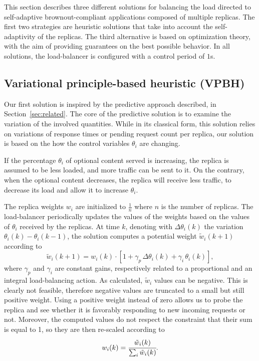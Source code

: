 This section describes three different solutions for balancing the
load directed to self-adaptive brownout-compliant applications
composed of multiple replicas. The first two strategies are heuristic
solutions that take into account the self-adaptivity of the
replicas. The third alternative is based on optimization theory, with
the aim of providing guarantees on the best possible behavior. In all
solutions, the load-balancer is configured with a control period of
$1$s.

\subsection{Variational principle-based heuristic (VPBH)}

Our first solution is inspired by the predictive approach described,
in Section~\ref{sec:related}. The core of the predictive solution is
to examine the variation of the involved quantities. While in its
classical form, this solution relies on variations of response times
or pending request count per replica, our solution is based on the how
the control variables $\theta_i$ are changing.

If the percentage $\theta_i$ of optional content served is increasing,
the replica is assumed to be less loaded, and more traffic can be sent
to it. On the contrary, when the optional content decreases, the
replica will receive less traffic, to decrease its load and allow it
to increase $\theta_i$.

The replica weights $w_i$ are initialized to $\frac{1}{n}$ where $n$
is the number of replicas. The load-balancer periodically updates the
values of the weights based on the values of $\theta_i$ received by
the replicas. At time $k$, denoting with $\Delta \theta_i (k)$ the
variation $\theta_i (k) - \theta_i (k-1)$, the solution computes a
potential weight $\tilde{w}_i(k+1)$ according to
\begin{equation}
  \tilde{w}_i(k+1) = w_i(k) \cdot 
\left[ 1 + \gamma_p \, \Delta \theta_i (k) + \gamma_i \, \theta_i (k) \right] ,
\label{eq:theta-diff}
\end{equation}
where $\gamma_p$ and $\gamma_i$ are constant gains, respectively
related to a proportional and an integral load-balancing action. As
calculated, $\tilde{w}_i$ values can be negative. This is clearly not
feasible, therefore negative values are truncated to a small but still
positive weight. Using a positive weight instead of zero allows us to
probe the replica and see whether it is favorably responding to new
incoming requests or not. Moreover, the computed values do not respect
the constraint that their sum is equal to 1, so they are then
re-scaled according to
\begin{equation}
  w_i (k) = \cfrac{\tilde{w}_i (k)}{\sum_i \tilde{w}_i (k)}.
\label{eq:theta-diff-rescale}
\end{equation}

